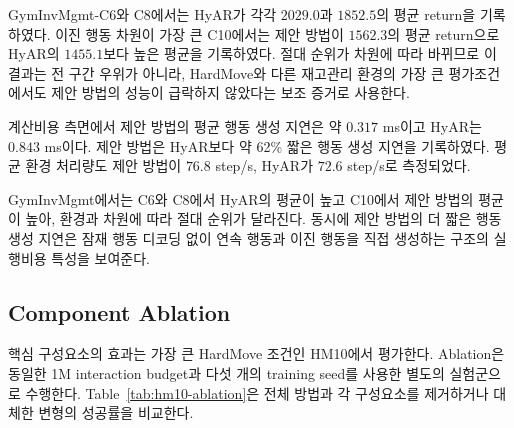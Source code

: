 \documentclass[10pt,journal]{IEEEtran}
\begin{document}
GymInvMgmt-C6와 C8에서는 HyAR가 각각 $2029.0$과
$1852.5$의 평균 return을 기록하였다. 이진 행동 차원이 가장 큰 C10에서는 제안 방법이 $1562.3$의 평균 return으로 HyAR의
$1455.1$보다 높은 평균을 기록하였다. 절대 순위가 차원에 따라 바뀌므로 이 결과는 전 구간 우위가 아니라, HardMove와 다른 재고관리 환경의 가장 큰 평가조건에서도 제안 방법의 성능이 급락하지 않았다는 보조 증거로 사용한다.

계산비용 측면에서 제안 방법의 평균 행동 생성 지연은 약 $0.317$ ms이고 HyAR는 $0.843$ ms이다. 제안 방법은 HyAR보다 약 62\% 짧은 행동 생성 지연을 기록하였다. 평균 환경 처리량도 제안 방법이 $76.8$ step/s, HyAR가 $72.6$ step/s로 측정되었다.

GymInvMgmt에서는 C6와 C8에서 HyAR의 평균이 높고 C10에서 제안 방법의 평균이 높아, 환경과 차원에 따라 절대 순위가 달라진다. 동시에 제안 방법의 더 짧은 행동 생성 지연은 잠재 행동 디코딩 없이 연속 행동과 이진 행동을 직접 생성하는 구조의 실행비용 특성을 보여준다.


\subsection{Component Ablation}

핵심 구성요소의 효과는 가장 큰 HardMove 조건인 HM10에서 평가한다. Ablation은 동일한 1M interaction budget과 다섯 개의 training seed를 사용한 별도의 실험군으로 수행한다. Table~\ref{tab:hm10-ablation}은 전체 방법과 각 구성요소를 제거하거나 대체한 변형의 성공률을 비교한다.

\begin{table}[t]
\centering
\caption{
Component ablation on HardMove-10.
Results are mean and sample standard deviation over five seeds.
The ablation uses an independently sampled set of training seeds.
}
\label{tab:hm10-ablation}
\end{table}
\end{document}
